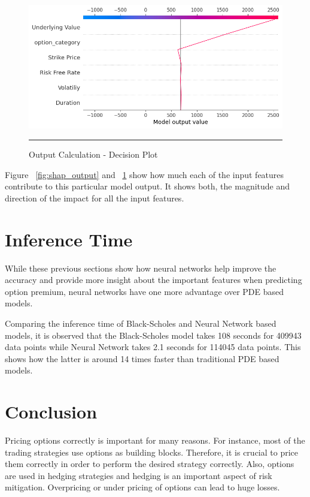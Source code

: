 \begin{figure}[htbp]
  \centering
    \includegraphics[scale=0.6]{Figures/shap4.png}
    \rule{35em}{0.5pt}
  \caption[Output Calculation - Decision Plot]{Output Calculation - Decision Plot}
  \label{fig:shap_output2}
\end{figure}

Figure ~\ref{fig:shap_output} and ~\ref{fig:shap_output2} show how much each of the input features contribute to this particular model output. It shows both, the magnitude and direction of the impact for all the input features. 

\section{Inference Time}

While these previous sections show how neural networks help improve the accuracy and provide more insight about the important features when predicting option premium, neural networks have one more advantage over PDE based models. 

Comparing the inference time of Black-Scholes and Neural Network based models, it is observed that the Black-Scholes model takes 108 seconds for 409943 data points while Neural Network takes 2.1 seconds for 114045 data points. This shows how the latter is around 14 times faster than traditional PDE based models.   


\section{Conclusion}

Pricing options correctly is important for many reasons. For instance, most of the trading strategies use options as building blocks. Therefore, it is crucial to price them correctly in order to perform the desired strategy correctly. Also, options are used in hedging strategies and hedging is an important aspect of risk mitigation. Overpricing or under pricing of options can lead to huge losses. 

